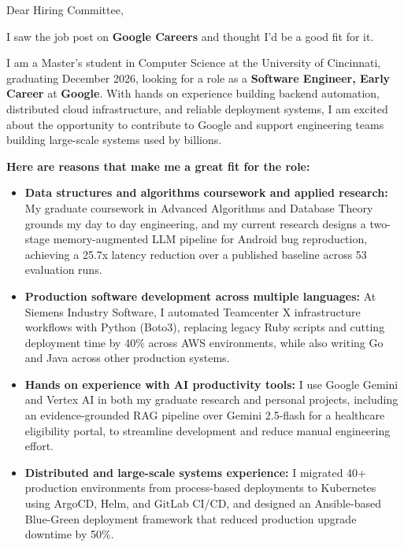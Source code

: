 \documentclass[11pt]{letter}
\date{}
\begin{document}
\begin{letter}{}

\opening{Dear Hiring Committee,}

I saw the job post on \textbf{Google Careers} and thought I'd be a good fit for it.

I am a Master's student in Computer Science at the University of Cincinnati, graduating December 2026, looking for a role as a \textbf{Software Engineer, Early Career} at \textbf{Google}. With hands on experience building backend automation, distributed cloud infrastructure, and reliable deployment systems, I am excited about the opportunity to contribute to Google and support engineering teams building large-scale systems used by billions.

\textbf{Here are reasons that make me a great fit for the role:}

\begin{itemize}[leftmargin=*, itemsep=0.45em]
    \item \textbf{Data structures and algorithms coursework and applied research:} My graduate coursework in Advanced Algorithms and Database Theory grounds my day to day engineering, and my current research designs a two-stage memory-augmented LLM pipeline for Android bug reproduction, achieving a 25.7x latency reduction over a published baseline across 53 evaluation runs.

    \item \textbf{Production software development across multiple languages:} At Siemens Industry Software, I automated Teamcenter X infrastructure workflows with Python (Boto3), replacing legacy Ruby scripts and cutting deployment time by 40\% across AWS environments, while also writing Go and Java across other production systems.

    \item \textbf{Hands on experience with AI productivity tools:} I use Google Gemini and Vertex AI in both my graduate research and personal projects, including an evidence-grounded RAG pipeline over Gemini 2.5-flash for a healthcare eligibility portal, to streamline development and reduce manual engineering effort.

    \item \textbf{Distributed and large-scale systems experience:} I migrated 40+ production environments from process-based deployments to Kubernetes using ArgoCD, Helm, and GitLab CI/CD, and designed an Ansible-based Blue-Green deployment framework that reduced production upgrade downtime by 50\%.


\end{itemize}
\end{letter}
\end{document}
